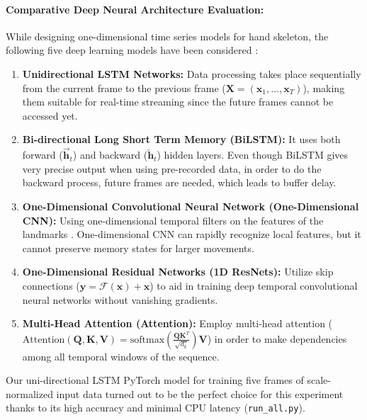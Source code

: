 \paragraph{Comparative Deep Neural Architecture Evaluation:}
While designing one-dimensional time series models for hand skeleton, the following five deep learning models have been considered \cite{Lai2018CNN, Ikram2020Skeleton, Nunez2018Convolutional, Doan2022Efficient, Gammulle2021TMMF}:
\begin{enumerate}
    \item \textbf{Unidirectional LSTM Networks:} Data processing takes place sequentially from the current frame to the previous frame ($\mathbf{X} = (\mathbf{x}_1, \dots, \mathbf{x}_T)$), making them suitable for real-time streaming since the future frames cannot be accessed yet.
    \item \textbf{Bi-directional Long Short Term Memory (BiLSTM):} It uses both forward ($\overrightarrow{\mathbf{h}}_t$) and backward ($\overleftarrow{\mathbf{h}}_t$) hidden layers. Even though BiLSTM gives very precise output when using pre-recorded data, in order to do the backward process, future frames are needed, which leads to buffer delay.
    \item \textbf{One-Dimensional Convolutional Neural Network (One-Dimensional CNN):} Using one-dimensional temporal filters on the features of the landmarks \cite{Lai2018CNN, Ikram2020Skeleton}. One-dimensional CNN can rapidly recognize local features, but it cannot preserve memory states for larger movements.
    \item \textbf{One-Dimensional Residual Networks (1D ResNets):} Utilize skip connections ($\mathbf{y} = \mathcal{F}(\mathbf{x}) + \mathbf{x}$) to aid in training deep temporal convolutional neural networks without vanishing gradients.
    \item \textbf{Multi-Head Attention (Attention):} Employ multi-head attention ($\text{Attention}(\mathbf{Q}, \mathbf{K}, \mathbf{V}) = \text{softmax}\left(\frac{\mathbf{Q} \mathbf{K}^T}{\sqrt{d_k}}\right) \mathbf{V}$) in order to make dependencies among all temporal windows of the sequence.
\end{enumerate}

Our uni-directional LSTM PyTorch model for training five frames of scale-normalized input data turned out to be the perfect choice for this experiment thanks to its high accuracy and minimal CPU latency (\texttt{run\_all.py}).

